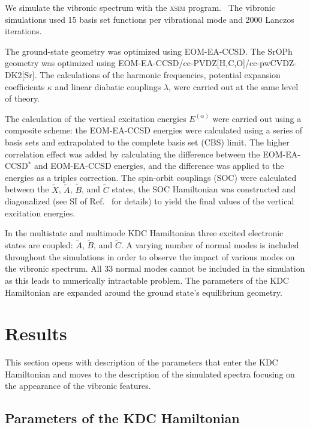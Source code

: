 \documentclass{article}
\begin{document}
We simulate the vibronic spectrum with the \textsc{xsim}
program.~\autocite{Sharma:xsim_socjt:2024} The vibronic simulations used 15
basis set functions per vibrational mode and 2000 Lanczos iterations.
 
The ground-state geometry was optimized using EOM-EA-CCSD. The SrOPh geometry
was optimized using EOM-EA-CCSD/cc-PVDZ[H,C,O]/cc-pwCVDZ-DK2[Sr]. The
calculations of the harmonic frequencies, potential expansion coefficients
$\kappa$ and linear diabatic couplings $\lambda$, were carried out at the same
level of theory.

The calculation of the vertical excitation energies $E ^{(\alpha)}$ were
carried out using a composite scheme: the EOM-EA-CCSD energies were calculated
using a series of basis sets and extrapolated to the complete basis set (CBS)
limit. The higher correlation effect was added by calculating the difference
between the EOM-EA-CCSD$^*$ and EOM-EA-CCSD energies, and the difference was
applied to the energies as a triples correction. The spin-orbit couplings (SOC)
were calculated between the $\tilde{X}$, $\tilde{A}$, $\tilde{B}$, and
$\tilde{C}$ states, the SOC Hamiltonian was constructed and diagonalized (see
SI of Ref.~\cite{Khvorost:dualOCC:2024} for details) to yield the final
values of the vertical excitation energies.

In the multistate and multimode KDC Hamiltonian three excited electronic states are coupled: $\tilde{A}$, $\tilde{B}$, and $\tilde{C}$. A varying number of normal modes is included throughout the simulations in order to observe the impact of various modes on the vibronic spectrum. All 33 normal modes cannot be included in the simulation as this leads to numerically intractable problem. The parameters of the KDC Hamiltonian are expanded around the ground state's equilibrium geometry.

\section{Results}

This section opens with description of the parameters that enter the KDC
Hamiltonian and moves to the description of the simulated spectra focusing on
the appearance of the vibronic features.

\subsection{Parameters of the KDC Hamiltonian}
\label{sec:results:parameters}
\end{document}
